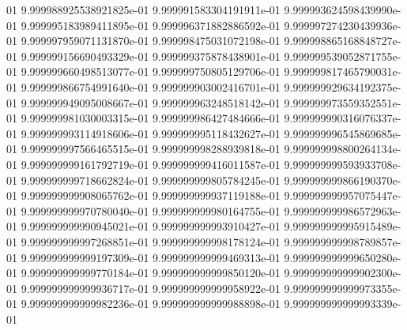 01	9.999988925538921825e-01	9.999991583304191911e-01	9.999993624598439990e-01	9.999995183989411895e-01	9.999996371882886592e-01	9.999997274230439936e-01	9.999997959071131870e-01	9.999998475031072198e-01	9.999998865168848727e-01	9.999999156690493329e-01	9.999999375878438901e-01	9.999999539052871755e-01	9.999999660498513077e-01	9.999999750805129706e-01	9.999999817465790031e-01	9.999999866754991640e-01	9.999999903002416701e-01	9.999999929634192375e-01	9.999999949095008667e-01	9.999999963248518142e-01	9.999999973559352551e-01	9.999999981030003315e-01	9.999999986427484666e-01	9.999999990316076337e-01	9.999999993114918606e-01	9.999999995118432627e-01	9.999999996545869685e-01	9.999999997566465515e-01	9.999999998288939818e-01	9.999999998800264134e-01	9.999999999161792719e-01	9.999999999416011587e-01	9.999999999593933708e-01	9.999999999718662824e-01	9.999999999805784245e-01	9.999999999866190370e-01	9.999999999908065762e-01	9.999999999937119188e-01	9.999999999957075447e-01	9.999999999970780040e-01	9.999999999980164755e-01	9.999999999986572963e-01	9.999999999990945021e-01	9.999999999993910427e-01	9.999999999995915489e-01	9.999999999997268851e-01	9.999999999998178124e-01	9.999999999998789857e-01	9.999999999999197309e-01	9.999999999999469313e-01	9.999999999999650280e-01	9.999999999999770184e-01	9.999999999999850120e-01	9.999999999999902300e-01	9.999999999999936717e-01	9.999999999999958922e-01	9.999999999999973355e-01	9.999999999999982236e-01	9.999999999999988898e-01	9.999999999999993339e-01
